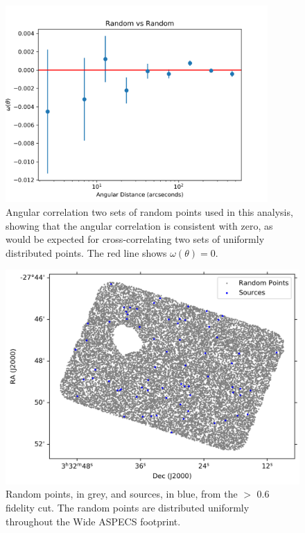 \begin{figure}[!htbp]
\centering \includegraphics[width=100mm]{clustering/5Random_vs_Random_10000_bin9.png}
\caption{Angular correlation two sets of random points used in this analysis, showing that the angular correlation is consistent with zero, as would be expected for cross-correlating two sets of uniformly distributed points. The red line shows $\omega(\theta) = 0$.}
\label{fig:random_points}
\end{figure}

\begin{figure}[!htbp]
\centering \includegraphics[width=120mm]{PDFS/NX_V_Y_Sources_20000.png}
\caption{Random points, in grey, and sources, in blue, from the $>$ 0.6 fidelity cut. The random points are distributed uniformly throughout the Wide ASPECS footprint.}
\label{fig:Clustering_points}
\end{figure}

